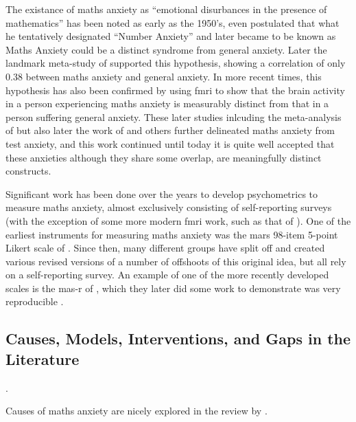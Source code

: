 \documentclass[14pt]{memoir}
\begin{document}
The existance of maths anxiety as ``emotional disurbances in the presence of mathematics'' has been noted as early as the 1950's,  even postulated that what he tentatively designated ``Number Anxiety'' and later became to be known as Maths Anxiety could be a distinct syndrome from general anxiety. Later the landmark meta-study of  supported this hypothesis, showing a correlation of only $0.38$ between maths anxiety and general anxiety. In more recent times, this hypothesis has also been confirmed by  using \gls{fmri} to show that the brain activity in a person experiencing maths anxiety is measurably distinct from that in a person suffering general anxiety. These later studies inlcuding the meta-analysis of  but also later the work of  and others further delineated maths anxiety from test anxiety, and this work continued until today it is quite well accepted that these anxieties although they share some overlap, are meaningfully distinct constructs.

Significant work has been done over the years to develop psychometrics to measure maths anxiety, almost exclusively consisting of self-reporting surveys (with the exception of some more modern \gls{fmri} work, such as that of ). One of the earliest instruments for measuring maths anxiety was the \gls{mars} 98-item 5-point Likert scale of . Since then, many different groups have split off and created various revised versions of a number of offshoots of this original idea, but all rely on a self-reporting survey. An example of one of the more recently developed scales is the \gls{mas-r} of , which they later did some work to demonstrate was very reproducible \cite{Bai2011}.



\subsection*{Causes, Models, Interventions, and Gaps in the Literature}.

Causes of maths anxiety are nicely explored in the review by \cite{Ramirez2018}.
\end{document}
